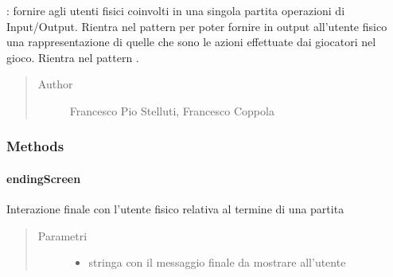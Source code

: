 \documentclass[letterpaper,10pt,italian,openany,oneside]{sphinxmanual}
\begin{document}
\begin{fulllineitems}
\label{\detokenize{source/it/unicam/cs/pa/mastermind/ui/GameView:it.unicam.cs.pa.mastermind.ui.GameView}}
: fornire agli utenti fisici coinvolti in una singola partita operazioni di Input/Output. Rientra nel pattern  per poter fornire in output all’utente fisico una rappresentazione di quelle che sono le azioni effettuate dai giocatori nel gioco. Rientra nel pattern .
\begin{quote}\begin{description}
\item[{Author}] \leavevmode
Francesco Pio Stelluti, Francesco Coppola

\end{description}\end{quote}

\end{fulllineitems}



\subsubsection{Methods}
\label{\detokenize{source/it/unicam/cs/pa/mastermind/ui/GameView:methods}}

\paragraph{endingScreen}
\label{\detokenize{source/it/unicam/cs/pa/mastermind/ui/GameView:endingscreen}}

\begin{fulllineitems}
\label{\detokenize{source/it/unicam/cs/pa/mastermind/ui/GameView:it.unicam.cs.pa.mastermind.ui.GameView.endingScreen(String)}}
Interazione finale con l’utente fisico relativa al termine di una partita
\begin{quote}\begin{description}
\item[{Parametri}] \leavevmode\begin{itemize}
\item {} 
 \textendash{} stringa con il messaggio finale da mostrare all’utente

\end{itemize}

\end{description}\end{quote}

\end{fulllineitems}
\end{document}
